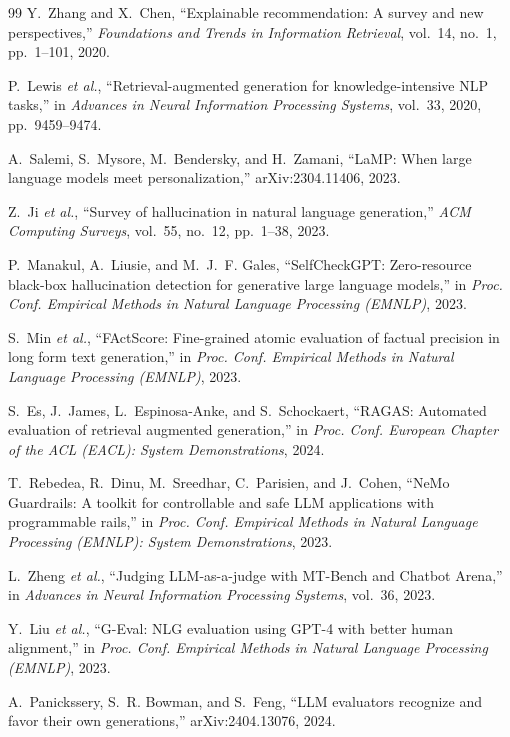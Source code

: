 \documentclass[journal]{IEEEtran}
\begin{document}
\begin{thebibliography}{99}
Y.~Zhang and X.~Chen, ``Explainable recommendation: A survey and new
perspectives,'' \emph{Foundations and Trends in Information Retrieval},
vol.~14, no.~1, pp.~1--101, 2020.

P.~Lewis \emph{et al.}, ``Retrieval-augmented generation for
knowledge-intensive NLP tasks,'' in \emph{Advances in Neural Information
Processing Systems}, vol.~33, 2020, pp.~9459--9474.

A.~Salemi, S.~Mysore, M.~Bendersky, and H.~Zamani, ``LaMP: When large language
models meet personalization,'' arXiv:2304.11406, 2023.

Z.~Ji \emph{et al.}, ``Survey of hallucination in natural language
generation,'' \emph{ACM Computing Surveys}, vol.~55, no.~12, pp.~1--38, 2023.

P.~Manakul, A.~Liusie, and M.~J.~F. Gales, ``SelfCheckGPT: Zero-resource
black-box hallucination detection for generative large language models,'' in
\emph{Proc. Conf. Empirical Methods in Natural Language Processing (EMNLP)},
2023.

S.~Min \emph{et al.}, ``FActScore: Fine-grained atomic evaluation of factual
precision in long form text generation,'' in \emph{Proc. Conf. Empirical
Methods in Natural Language Processing (EMNLP)}, 2023.

S.~Es, J.~James, L.~Espinosa-Anke, and S.~Schockaert, ``RAGAS: Automated
evaluation of retrieval augmented generation,'' in \emph{Proc. Conf. European
Chapter of the ACL (EACL): System Demonstrations}, 2024.

T.~Rebedea, R.~Dinu, M.~Sreedhar, C.~Parisien, and J.~Cohen, ``NeMo Guardrails:
A toolkit for controllable and safe LLM applications with programmable rails,''
in \emph{Proc. Conf. Empirical Methods in Natural Language Processing (EMNLP):
System Demonstrations}, 2023.

L.~Zheng \emph{et al.}, ``Judging LLM-as-a-judge with MT-Bench and Chatbot
Arena,'' in \emph{Advances in Neural Information Processing Systems}, vol.~36,
2023.

Y.~Liu \emph{et al.}, ``G-Eval: NLG evaluation using GPT-4 with better human
alignment,'' in \emph{Proc. Conf. Empirical Methods in Natural Language
Processing (EMNLP)}, 2023.

A.~Panickssery, S.~R. Bowman, and S.~Feng, ``LLM evaluators recognize and favor
their own generations,'' arXiv:2404.13076, 2024.


\end{thebibliography}
\end{document}
